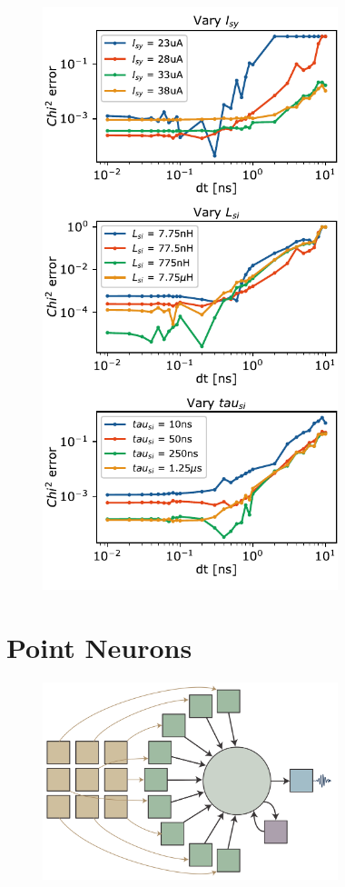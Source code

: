 \documentclass[twocolumn]{article}
\begin{document}
\begin{figure}[h!]
\includegraphics[width=8.6cm]{figures/_05__syn__error_vs_dt.pdf}
\end{figure}

\section{\label{sec:point_neurons}Point Neurons}

\begin{figure}[h!]
\includegraphics[width=8.6cm]{figures/_06__point_neuron__nine_pixel_schematic.pdf}
\end{figure}
 
\end{document}
